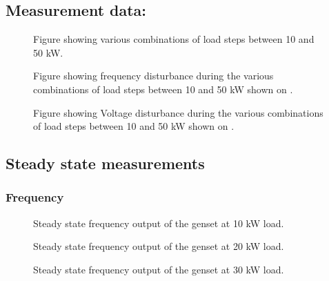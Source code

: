\subsection*{Measurement data:}
\begin{figure}[H]
\centering

\caption{Figure showing various combinations of load steps between 10 and 50 kW.}
\label{fig:test8-9power}
\end{figure}



\begin{figure}[H]
\centering

\caption{Figure showing frequency disturbance during the various combinations of load steps between 10 and 50 kW shown on .}
\label{fig:test8-9freq}
\end{figure}


\begin{figure}[H]
\centering

\caption{Figure showing Voltage disturbance during the various combinations of load steps between 10 and 50 kW shown on .}
\label{fig:test8-9volt}
\end{figure}

\subsection*{Steady state measurements}
\subsubsection*{Frequency}
\begin{figure}[H]
\centering

\caption{Steady state frequency output of the genset at 10 kW load.}
\label{fig:test8-9steadyfrequency10kw}
\end{figure}

\begin{figure}[H]
\centering

\caption{Steady state frequency output of the genset at 20 kW load.}
\label{fig:test8-9steadyfrequency20kw}
\end{figure}

\begin{figure}[H]
\centering

\caption{Steady state frequency output of the genset at 30 kW load.}
\label{fig:test8-9steadyfrequency30kw}
\end{figure}

